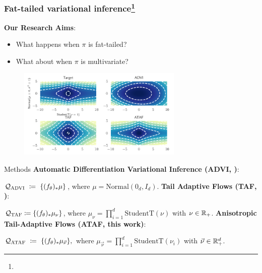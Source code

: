 \begin{frame}
    \frametitle{Fat-tailed variational inference\footnote{\tiny {}}}
    
    \textbf{Our Research Aims}:
    \begin{itemize}
        \item 
        What happens when $\pi$ is fat-tailed?
        \item 
        What about when $\pi$ is multivariate?
    \end{itemize}
    
    
    \begin{figure}[htbp]
      \centering
      \includegraphics[width=0.7\textwidth]{Figures/ftvi/pancake.pdf}
      \label{fig:pancake}
    \end{figure}
\end{frame}

\begin{frame}{Methods}
    \textbf{Automatic Differentiation Variational Inference (ADVI, \cite{kucukelbir2017automatic,webb2019improving})}:
    
      \quad 
      $\mathcal{Q}_\text{ADVI}~\coloneqq~\{
        (f_\theta)_\ast \mu
        \}$, 
      where $\mu = \text{Normal}(0_d, I_d)$.
      \vspace{3mm}
    \pause
    \textbf{Tail Adaptive Flows (TAF, \cite{jaini2020tails})}:
    
      \quad 
      $\mathcal{Q}_\text{TAF}
        \coloneqq \{
        (f_\theta)_\ast \mu_\nu
        \}$,
      where $\mu_\nu = \prod_{i=1}^d \text{StudentT}(\nu)$ with $\nu \in \mathbb{R}_+$.
      \vspace{3mm}
    \pause
    \textbf{Anisotropic Tail-Adaptive Flows (ATAF, this work)}:
    
      \quad 
      $\mathcal{Q}_\text{ATAF}~\coloneqq~\{
        (f_\theta)_\ast \mu_{\vec{\nu}}
        \},$
      where $\mu_{\vec{\nu}} = \prod_{i=1}^d \text{StudentT}(\nu_i)$ with $\vec{\nu} \in \mathbb{R}_+^d$.
\end{frame}

